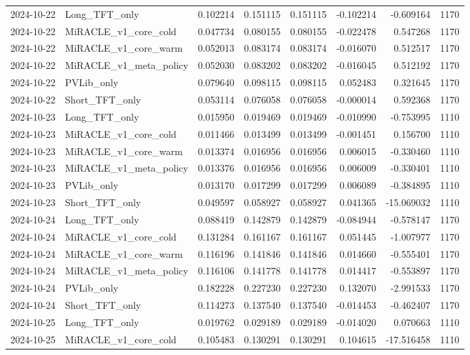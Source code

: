 \begin{tabular}{llrrrrrr}
2024-10-22 & Long_TFT_only & 0.102214 & 0.151115 & 0.151115 & -0.102214 & -0.609164 & 1170 \\
2024-10-22 & MiRACLE_v1_core_cold & 0.047734 & 0.080155 & 0.080155 & -0.022478 & 0.547268 & 1170 \\
2024-10-22 & MiRACLE_v1_core_warm & 0.052013 & 0.083174 & 0.083174 & -0.016070 & 0.512517 & 1170 \\
2024-10-22 & MiRACLE_v1_meta_policy & 0.052030 & 0.083202 & 0.083202 & -0.016045 & 0.512192 & 1170 \\
2024-10-22 & PVLib_only & 0.079640 & 0.098115 & 0.098115 & 0.052483 & 0.321645 & 1170 \\
2024-10-22 & Short_TFT_only & 0.053114 & 0.076058 & 0.076058 & -0.000014 & 0.592368 & 1170 \\
2024-10-23 & Long_TFT_only & 0.015950 & 0.019469 & 0.019469 & -0.010990 & -0.753995 & 1110 \\
2024-10-23 & MiRACLE_v1_core_cold & 0.011466 & 0.013499 & 0.013499 & -0.001451 & 0.156700 & 1110 \\
2024-10-23 & MiRACLE_v1_core_warm & 0.013374 & 0.016956 & 0.016956 & 0.006015 & -0.330460 & 1110 \\
2024-10-23 & MiRACLE_v1_meta_policy & 0.013376 & 0.016956 & 0.016956 & 0.006009 & -0.330401 & 1110 \\
2024-10-23 & PVLib_only & 0.013170 & 0.017299 & 0.017299 & 0.006089 & -0.384895 & 1110 \\
2024-10-23 & Short_TFT_only & 0.049597 & 0.058927 & 0.058927 & 0.041365 & -15.069032 & 1110 \\
2024-10-24 & Long_TFT_only & 0.088419 & 0.142879 & 0.142879 & -0.084944 & -0.578147 & 1170 \\
2024-10-24 & MiRACLE_v1_core_cold & 0.131284 & 0.161167 & 0.161167 & 0.051445 & -1.007977 & 1170 \\
2024-10-24 & MiRACLE_v1_core_warm & 0.116196 & 0.141846 & 0.141846 & 0.014660 & -0.555401 & 1170 \\
2024-10-24 & MiRACLE_v1_meta_policy & 0.116106 & 0.141778 & 0.141778 & 0.014417 & -0.553897 & 1170 \\
2024-10-24 & PVLib_only & 0.182228 & 0.227230 & 0.227230 & 0.132070 & -2.991533 & 1170 \\
2024-10-24 & Short_TFT_only & 0.114273 & 0.137540 & 0.137540 & -0.014453 & -0.462407 & 1170 \\
2024-10-25 & Long_TFT_only & 0.019762 & 0.029189 & 0.029189 & -0.014020 & 0.070663 & 1110 \\
2024-10-25 & MiRACLE_v1_core_cold & 0.105483 & 0.130291 & 0.130291 & 0.104615 & -17.516458 & 1110 \\

\end{tabular}
